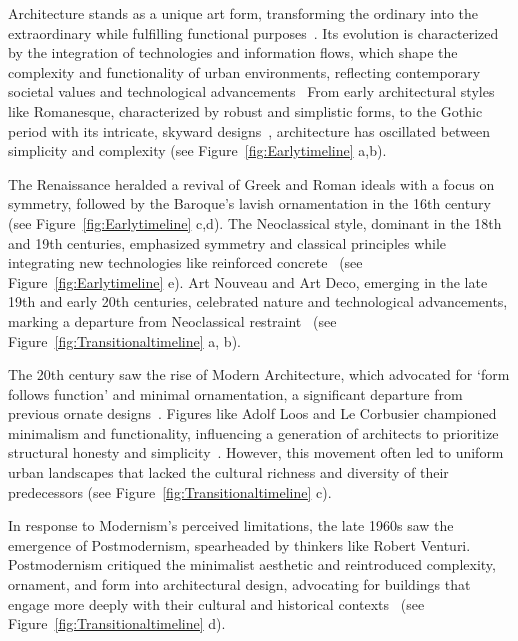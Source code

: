 
Architecture stands as a unique art form, transforming the ordinary into the extraordinary while fulfilling functional purposes~\cite{Jiang2023}.
Its evolution is characterized by the integration of technologies and information flows, which shape the complexity and functionality of urban environments, reflecting contemporary societal values and technological advancements~\cite{Leach2015}
From early architectural styles like Romanesque, characterized by robust and simplistic forms, to the Gothic period with its intricate, skyward designs~\cite{Kennedy2013}, architecture has oscillated between simplicity and complexity (see Figure~\ref{fig:Earlytimeline} a,b).

The Renaissance heralded a revival of Greek and Roman ideals with a focus on symmetry, followed by the Baroque's lavish ornamentation in the 16th century~\cite{Marder1990} (see Figure~\ref{fig:Earlytimeline} c,d).
The Neoclassical style, dominant in the 18th and 19th centuries, emphasized symmetry and classical principles while integrating new technologies like reinforced concrete~\cite{Adebusuyi2022} (see Figure~\ref{fig:Earlytimeline} e).
Art Nouveau and Art Deco, emerging in the late 19th and early 20th centuries, celebrated nature and technological advancements, marking a departure from Neoclassical restraint~\cite{Salas2018} (see Figure~\ref{fig:Transitionaltimeline} a, b).

The 20th century saw the rise of Modern Architecture, which advocated for `form follows function' and minimal ornamentation, a significant departure from previous ornate designs~\cite{Leach2016}.
Figures like Adolf Loos and Le Corbusier championed minimalism and functionality, influencing a generation of architects to prioritize structural honesty and simplicity~\cite{Saglam2014}.
However, this movement often led to uniform urban landscapes that lacked the cultural richness and diversity of their predecessors (see Figure~\ref{fig:Transitionaltimeline} c).

In response to Modernism's perceived limitations, the late 1960s saw the emergence of Postmodernism, spearheaded by thinkers like Robert Venturi.
Postmodernism critiqued the minimalist aesthetic and reintroduced complexity, ornament, and form into architectural design, advocating for buildings that engage more deeply with their cultural and historical contexts~\cite{Venturi1972} (see Figure~\ref{fig:Transitionaltimeline} d).

